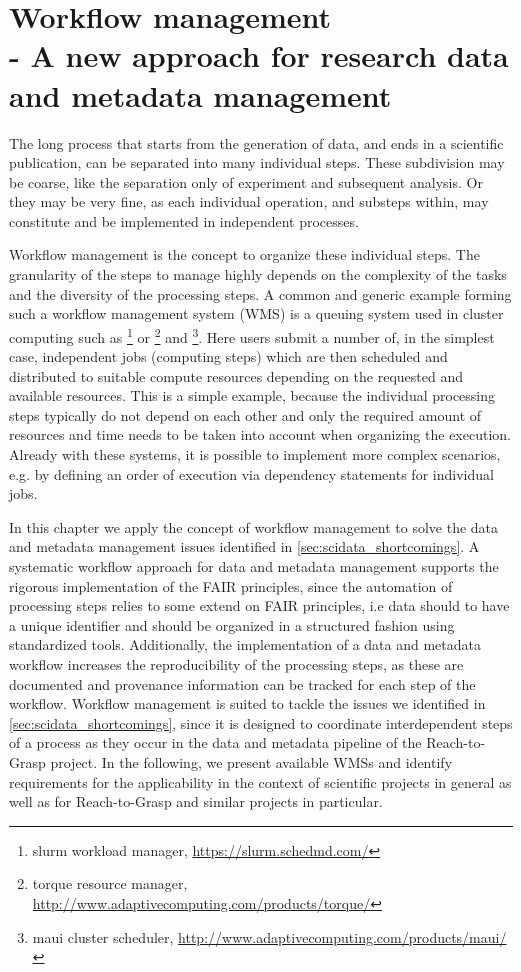 \clearpage
\chapter[Workflow management]{Workflow management\\- A new approach for research data and metadata management}
\label{sec:workflows}
The long process that starts from the generation of data, and ends in a scientific publication, can be separated into many individual steps. These subdivision may be coarse, like the separation only of experiment and subsequent analysis. Or they may be very fine, as each individual operation, and substeps within, may constitute and be implemented in independent processes.

Workflow management is the concept to organize these individual steps. The granularity of the steps to manage highly depends on the complexity of the tasks and the diversity of the processing steps. A common and generic example forming such a workflow management system (WMS) is a queuing system used in cluster computing such as \footnote{slurm workload manager, \url{https://slurm.schedmd.com/}} or  \footnote{torque resource manager, \url{http://www.adaptivecomputing.com/products/torque/}} and \footnote{maui cluster scheduler, \url{http://www.adaptivecomputing.com/products/maui/}}. Here users submit a number of, in the simplest case, independent jobs (computing steps) which are then scheduled and distributed to suitable compute resources depending on the requested and available resources. This is a simple example, because the individual processing steps typically do not depend on each other and only the required amount of resources and time needs to be taken into account when organizing the execution. Already with these systems, it is possible to implement more complex scenarios, e.g. by defining an order of execution via dependency statements for individual jobs.

In this chapter we apply the concept of workflow management to solve the data and metadata management issues identified in \cref{sec:scidata_shortcomings}. A systematic workflow approach for data and metadata management supports the rigorous implementation of the FAIR principles, since the automation of processing steps relies to some extend on FAIR principles, i.e data should to have a unique identifier and should be organized in a structured fashion using standardized tools. Additionally, the implementation of a data and metadata workflow increases the reproducibility of the processing steps, as these are documented and provenance information can be tracked for each step of the workflow. Workflow management is suited to tackle the issues we identified in \cref{sec:scidata_shortcomings}, since it is designed to coordinate interdependent steps of a process as they occur in the data and metadata pipeline of the Reach-to-Grasp project. In the following, we present available WMSs and identify requirements for the applicability in the context of scientific projects in general as well as for Reach-to-Grasp and similar projects in particular.

